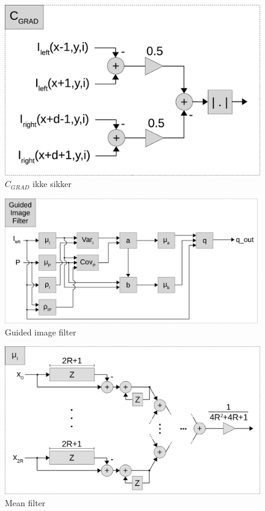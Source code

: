 \begin{figure}[ht!]
  \centering
  \includegraphics[scale=0.3]{figures/c_grad}
  \caption{$C_{GRAD}$ ikke sikker}
  \label{fig:c_grad}
\end{figure}

\begin{figure}[ht!]
  \centering
  \includegraphics[scale=0.3]{figures/guided_image_filter}
  \caption{Guided image filter}
  \label{fig:Guided_image_filter}
\end{figure}

\begin{figure}[ht!]
  \centering
  \includegraphics[scale=0.3]{figures/mean}
  \caption{Mean filter}
  \label{fig:mean}
\end{figure}

